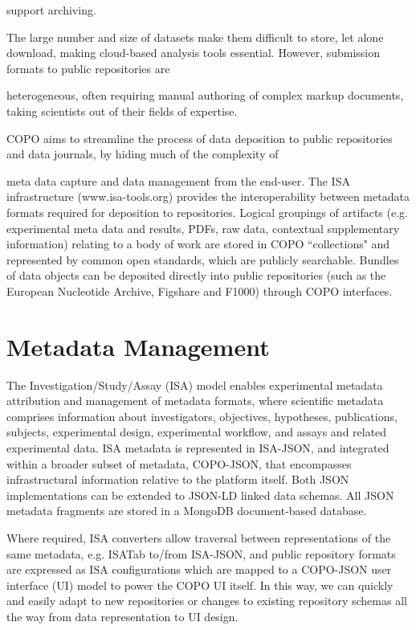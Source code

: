 \documentclass[runningheads,a4paper]{llncs}
\begin{document}
support archiving.

The large number and size of datasets make them difficult to
store, let alone download, making cloud-based analysis tools essential. However, submission formats to public repositories are

heterogeneous, often requiring manual authoring of complex markup
documents, taking scientists out of their fields of expertise.

COPO aims to streamline the process of data deposition to public
repositories and data journals, by hiding much of the complexity of

meta data capture and data management from the end-user. The ISA
infrastructure (www.isa-tools.org) provides the
interoperability between metadata formats required for deposition to repositories.  Logical groupings of artifacts (e.g. experimental meta data
and results, PDFs, raw data, contextual supplementary information)
relating to a body of work are stored in COPO “collections" and
represented by common open standards, which are publicly
searchable. Bundles of data objects can be
deposited directly into public repositories (such as the European Nucleotide Archive, Figshare and F1000) through COPO interfaces.



\vspace*{-0.3in}
\section{Metadata Management}

The Investigation/Study/Assay (ISA) model enables experimental
metadata attribution and management of metadata formats, where
scientific metadata comprises information about investigators,
objectives, hypotheses, publications, subjects, experimental design,
experimental workflow, and assays and related experimental data. ISA
metadata is represented in ISA-JSON, and integrated within a broader
subset of metadata, COPO-JSON, that encompasses infrastructural
information relative to the platform itself. Both JSON implementations
can be extended to JSON-LD linked data schemas. All JSON metadata
fragments are stored in a MongoDB document-based database.


Where required, ISA converters allow traversal between representations
of the same metadata, e.g. ISATab to/from ISA-JSON, and public
repository formats are expressed as ISA configurations which are
mapped to a COPO-JSON user interface (UI) model to power the COPO UI
itself. In this way, we can quickly and easily adapt to new
repositories or changes to existing repository schemas all the way
from data representation to UI design.
\end{document}

